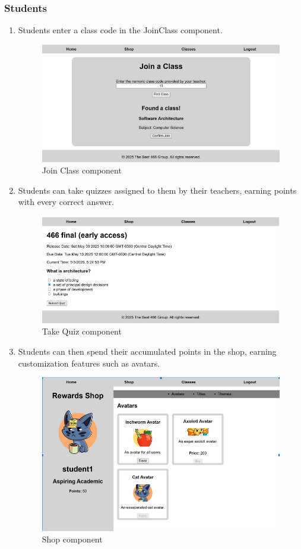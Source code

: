 \subsubsection{Students}
\begin{enumerate}
    \item Students enter a class code in the JoinClass component.
    \begin{figure}[h]
        \centering
        \includegraphics[width=0.7\linewidth]{PUT INDIVIDUAL SECTIONS HERE/images/joinClass.png}
        \caption{Join Class component}
        \label{join-class}
    \end{figure}
        \item Students can take quizzes assigned to them by their teachers, earning points with every correct answer.
    \begin{figure}[H]
        \centering
        \includegraphics[width=0.7\linewidth]{PUT INDIVIDUAL SECTIONS HERE/images/TakeQuiz.png}
        \caption{Take Quiz component}
        \label{take-quiz}
    \end{figure}
        \item Students can then spend their accumulated points in the shop, earning customization features such as avatars.
\begin{figure}[H]
    \centering
    \includegraphics[width=0.7\linewidth]{PUT INDIVIDUAL SECTIONS HERE/images/Shop.png}
    \caption{Shop component}
    \label{Shop}
\end{figure}
\end{enumerate}

